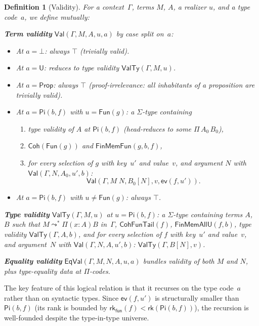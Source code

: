 \documentclass[11pt]{article}
\newcommand{\Pitype}[2]{\Pi(#1)#2}
\newcommand{\App}[2]{#1\;#2}
\newcommand{\PropCode}{\mathsf{Prop}}
\newcommand{\Bot}{\bot}
\newcommand{\UCode}{\mathsf{U}}
\newcommand{\FunEl}[1]{\mathsf{Fun}(#1)}
\newcommand{\PiC}[2]{\mathsf{Pi}(#1,#2)}
\newcommand{\EvalFun}{\mathsf{ev}}
\newcommand{\Coh}{\mathsf{Coh}}
\newcommand{\ValR}{\mathsf{Val}}
\newcommand{\EqValR}{\mathsf{EqVal}}
\newcommand{\Red}{\mathrel{\leadsto^*}}
\newtheorem{definition}[theorem]{Definition}
\begin{document}
\begin{definition}[Validity]
  For a context~$\Gamma$, terms $M$, $A$, a realizer $u$, and a
  type code~$a$, we define mutually:

  \medskip
  \noindent\textbf{Term validity} $\ValR(\Gamma, M, A, u, a)$
  by case split on~$a$:
  \begin{itemize}
    \item At $a = \Bot$: always $\top$ (trivially valid).
    \item At $a = \UCode$: reduces to type validity
      $\mathsf{ValTy}(\Gamma, M, u)$.
    \item At $a = \PropCode$: always $\top$ (proof-irrelevance:
      all inhabitants of a proposition are trivially valid).
    \item At $a = \PiC{b}{f}$ with $u = \FunEl{g}$: a
      $\Sigma$-type containing
      \begin{enumerate}
        \item type validity of $A$ at $\PiC{b}{f}$
          (head-reduces to some $\Pi\,A_0\,B_0$),
        \item $\Coh(\FunEl{g})$ and
          $\mathsf{FinMemFun}(g,b,f)$,
        \item for every selection of $g$ with key~$u'$ and
          value~$v$, and argument $N$ with
          $\ValR(\Gamma, N, A_0, u', b)$:
          \[
            \ValR(\Gamma, \App{M}{N}, B_0[N], v, \EvalFun(f, u')).
          \]
      \end{enumerate}
    \item At $a = \PiC{b}{f}$ with $u \neq \FunEl{g}$: always $\top$.
  \end{itemize}

  \medskip
  \noindent\textbf{Type validity} $\mathsf{ValTy}(\Gamma, M, u)$
  at $u = \PiC{b}{f}$:
  a $\Sigma$-type containing terms $A$, $B$ such that
  $M \Red \Pitype{x{:}A}{B}$ in~$\Gamma$,
  $\mathsf{CohFunTail}(f)$,
  $\mathsf{FinMemAllU}(f,b)$,
  type validity $\mathsf{ValTy}(\Gamma, A, b)$,
  and for every selection of $f$ with key~$u'$ and value~$v$,
  and argument~$N$ with $\ValR(\Gamma, N, A, u', b)$:
  $\mathsf{ValTy}(\Gamma, B[N], v)$.

  \medskip
  \noindent\textbf{Equality validity} $\EqValR(\Gamma, M, N, A, u, a)$
  bundles validity of both $M$ and $N$, plus type-equality data at
  $\Pi$-codes.
\end{definition}

The key feature of this logical relation is that it recurses on
the type code~$a$ rather than on syntactic types.  Since
$\EvalFun(f, u')$ is structurally smaller than $\PiC{b}{f}$
(its rank is bounded by $\mathsf{rk}_{\mathsf{fun}}(f)
< \mathsf{rk}(\PiC{b}{f})$), the recursion is well-founded
despite the type-in-type universe.
\end{document}
